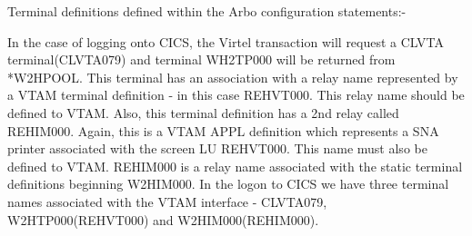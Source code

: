 \documentclass[letterpaper,10pt,english]{sphinxmanual}
\begin{document}

Terminal definitions defined within the Arbo configuration statements:-

\begin{sphinxVerbatim}[commandchars=\\\{\}]
                          

                          
\PYGZbs{}                                

                          
\PYGZbs{}                                 
\end{sphinxVerbatim}

In the case of logging onto CICS, the Virtel transaction will request a CLVTA terminal(CLVTA079) and terminal WH2TP000 will be returned from *W2HPOOL. This terminal has an association with a relay name represented by a VTAM terminal definition - in this case REHVT000. This relay name should be defined to VTAM. Also, this terminal definition has a 2nd relay called REHIM000. Again, this is a VTAM APPL definition which represents a SNA printer associated with the screen LU REHVT000. This name must also be defined to VTAM. REHIM000 is a relay name associated with the static terminal definitions beginning W2HIM000. In the logon to CICS we have three terminal names associated with the VTAM interface - CLVTA079, W2HTP000(REHVT000) and W2HIM000(REHIM000).
\end{document}
